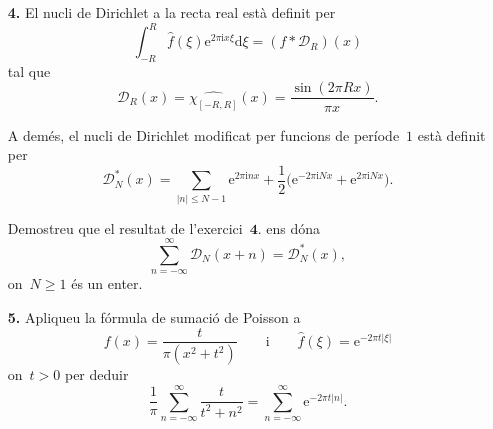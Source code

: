 \documentclass[a4paper]{article}
\theoremstyle{plain}
\newcommand{\iu}{\mathrm{i}}
\newcommand{\e}{\mathrm{e}}
\providecommand{\uppi}{\pi}
\newcommand{\diff}{\mathrm{d}}
\newcommand{\abs}[1]{\lvert{#1}\rvert}
\newcommand{\D}{\mathcal{D}}
\begin{document}
\begin{enumerate}
    \item[\textbf{4.}] El nucli de Dirichlet a la recta real està definit per
        \[
            \int_{-R}^{R}\widehat{f}(\xi)\e^{2\uppi\iu x\xi}\diff\xi
            = (f\ast \D_{R})(x)
        \]
        tal que
        \[
            \D_{R}(x) = \widehat{\chi_{[-R,R]}}(x)
            = \frac{\sin(2\uppi Rx)}{\uppi x}.
        \]

        A demés, el nucli de Dirichlet modificat per funcions de període~\(1\)
        està definit per
        \[
            \D^{\ast}_{N}(x)
            = \sum_{\abs{n} \leq N-1} \e^{2\uppi\iu nx}
            + \frac{1}{2}\bigl(\e^{-2\uppi\iu Nx} + \e^{2\uppi\iu Nx}\bigr).
        \]

        Demostreu que el resultat de l'exercici~\(\textbf{4.}\) ens dóna
        \[
            \sum_{n=-\infty}^{\infty} \D_{N}(x+n) = \D^{\ast}_{N}(x),
        \]
        on~\(N\geq1\) és un enter.
\end{enumerate}

\begin{enumerate}
    \item[\textbf{5.}] Apliqueu la fórmula de sumació de Poisson a
        \[
            f(x) = \frac{t}{\uppi(x^{2}+t^{2})}
            \qquad
            \text{i}
            \qquad
            \widehat{f}(\xi) = \e^{-2\uppi t\abs{\xi}}
        \]
        on~\(t>0\) per deduir
        \[
            \frac{1}{\uppi}
            \sum_{n=-\infty}^{\infty}
            \frac{t}{t^{2}+n^{2}}
            =
            \sum_{n=-\infty}^{\infty}
            \e^{-2\uppi t\abs{n}}.
        \]
\end{enumerate}
\end{document}
